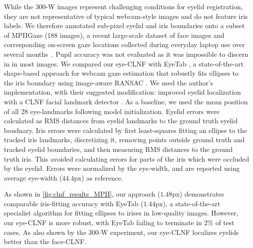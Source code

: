 While the 300-W images represent challenging conditions for eyelid registration, they are not representative of typical webcam-style images and do not feature iris labels.
We therefore annotated sub-pixel eyelid and iris boundaries onto a subset of MPIIGaze (188 images), a recent large-scale dataset of face images and corresponding on-screen gaze locations collected during everyday laptop use over several months~\cite{zhang15_cvpr}.
Pupil accuracy was not evaluated as it was impossible to discern in in most images.
We compared our eye-CLNF with EyeTab \cite{wood2014eyetab}, a state-of-the-art shape-based approach for webcam gaze estimation that robustly fits ellipses to the iris boundary using image-aware RANSAC \cite{swirski2012robust}.
We used the author's implementation, with their suggested modification: improved eyelid localization with a CLNF facial landmark detector \cite{baltrusaitis2013constrained}.
As a baseline, we used the mean position of all 28 eye-landmarks following model initialization.
Eyelid errors were calculated as RMS distances from eyelid landmarks to the ground truth eyelid boudnary.
Iris errors were calculated by first least-squares fitting an ellipse to the tracked iris landmarks, discretizing it, removing points outside ground truth and tracked eyelid boundaries, and then measuring RMS distances to the ground truth iris.
This avoided calculating errors for parts of the iris which were occluded by the eyelid.
Errors were normalized by the eye-width, and are reported using average eye-width ($44.4\textrm{px}$) as reference.

As shown in \autoref{fig:clnf_results_MPII}, our approach ($1.48\textrm{px}$) demonstrates comparable iris-fitting accuracy with EyeTab ($1.44\textrm{px}$), a state-of-the-art specialist algorithm for fitting ellipses to irises in low-quality images.
However, our eye-CLNF is more robust, with EyeTab failing to terminate in $2\%$ of test cases.
As also shown by the 300-W experiment, our eye-CLNF localizes eyelids better than the face-CLNF.



